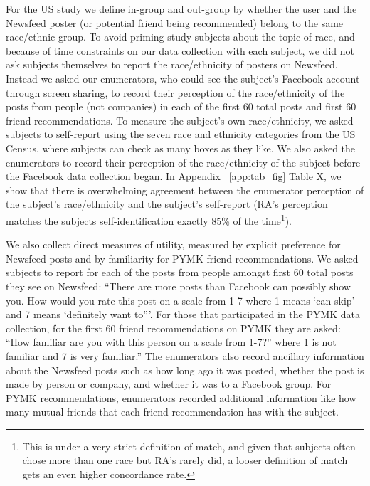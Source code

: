 \documentclass[12pt,letterpaper]{article}
\begin{document}
For the US study we define in-group and out-group by whether the user and the Newsfeed poster (or potential friend being recommended) belong to the same race/ethnic group. To avoid priming study subjects about the topic of race, and because of time constraints on our data collection with each subject, we did not ask subjects themselves to report the race/ethnicity of posters on Newsfeed. Instead we asked our enumerators, who could see the subject's Facebook account through screen sharing, to record their perception of the  race/ethnicity of the posts from people (not companies) in each of the first 60 total posts and first 60 friend recommendations. To measure the subject's own race/ethnicity, we asked subjects to self-report using the seven race and ethnicity categories from the US Census, where subjects can check as many boxes as they like. We also asked the enumerators to record their perception of the race/ethnicity of the subject before the Facebook data collection began. In Appendix ~\ref{app:tab_fig} Table X, we show that there is overwhelming agreement between the enumerator perception of the subject's race/ethnicity and the subject's self-report (RA's perception matches the subjects self-identification exactly 85\% of the time\footnote{This is under a very strict definition of match, and given that subjects often chose more than one race but RA's rarely did, a looser definition of match gets an even higher concordance rate.}).

We also collect direct measures of utility, measured by explicit preference for Newsfeed posts and by familiarity for PYMK friend recommendations. We asked subjects to report for each of the posts from people amongst first 60 total posts they see on Newsfeed: “There are more posts than Facebook can possibly show you. How would you rate this post on a scale from 1-7 where 1 means ‘can skip’ and 7 means ‘definitely want to'''. For those that participated in the PYMK data collection, for the first 60 friend recommendations on PYMK they are asked: “How familiar are you with this person on a scale from 1-7?” where 1 is not familiar and 7 is very familiar.'' The enumerators also record ancillary information about the Newsfeed posts such as how long ago it was posted, whether the post is made by person or company, and whether it was to a Facebook group. For PYMK recommendations, enumerators recorded additional information like how many mutual friends that each friend recommendation has with the subject.
\end{document}
